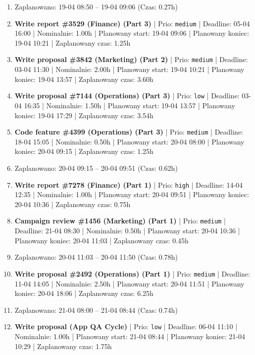{\begin{enumerate}
  \item [\textbf{PRZERWA}] Zaplanowano: 19-04 08:50 -- 19-04 09:06 (Czas: 0.27h)
  \item [\textbf{14672}] \textbf{Write report \#3529 (Finance) (Part 3)} | Prio: \texttt{medium} | Deadline: 05-04 16:00 | Nominalnie: 1.00h | Planowany start: 19-04 09:06 | Planowany koniec: 19-04 10:21 | Zaplanowany czas: 1.25h
  \item [\textbf{14673}] \textbf{Write proposal \#3842 (Marketing) (Part 2)} | Prio: \texttt{medium} | Deadline: 03-04 11:30 | Nominalnie: 2.00h | Planowany start: 19-04 10:21 | Planowany koniec: 19-04 13:57 | Zaplanowany czas: 3.60h
  \item [\textbf{14702}] \textbf{Write proposal \#7144 (Operations) (Part 3)} | Prio: \texttt{low} | Deadline: 03-04 16:35 | Nominalnie: 1.50h | Planowany start: 19-04 13:57 | Planowany koniec: 19-04 17:29 | Zaplanowany czas: 3.54h
  \item [\textbf{14664}] \textbf{Code feature \#4399 (Operations) (Part 3)} | Prio: \texttt{medium} | Deadline: 18-04 15:05 | Nominalnie: 0.50h | Planowany start: 20-04 08:00 | Planowany koniec: 20-04 09:15 | Zaplanowany czas: 1.25h
  \item [\textbf{PRZERWA}] Zaplanowano: 20-04 09:15 -- 20-04 09:51 (Czas: 0.62h)
  \item [\textbf{14609}] \textbf{Write report \#7278 (Finance) (Part 1)} | Prio: \texttt{high} | Deadline: 14-04 12:35 | Nominalnie: 1.00h | Planowany start: 20-04 09:51 | Planowany koniec: 20-04 10:36 | Zaplanowany czas: 0.75h
  \item [\textbf{14653}] \textbf{Campaign review \#1456 (Marketing) (Part 1)} | Prio: \texttt{medium} | Deadline: 21-04 08:30 | Nominalnie: 0.50h | Planowany start: 20-04 10:36 | Planowany koniec: 20-04 11:03 | Zaplanowany czas: 0.45h
  \item [\textbf{PRZERWA}] Zaplanowano: 20-04 11:03 -- 20-04 11:50 (Czas: 0.78h)
  \item [\textbf{14668}] \textbf{Write proposal \#2492 (Operations) (Part 1)} | Prio: \texttt{medium} | Deadline: 11-04 14:05 | Nominalnie: 2.50h | Planowany start: 20-04 11:51 | Planowany koniec: 20-04 18:06 | Zaplanowany czas: 6.25h
  \item [\textbf{PRZERWA}] Zaplanowano: 21-04 08:00 -- 21-04 08:44 (Czas: 0.74h)
  \item [\textbf{14695}] \textbf{Write proposal (App QA Cycle)} | Prio: \texttt{low} | Deadline: 06-04 11:10 | Nominalnie: 1.00h | Planowany start: 21-04 08:44 | Planowany koniec: 21-04 10:29 | Zaplanowany czas: 1.75h

\end{enumerate}}
